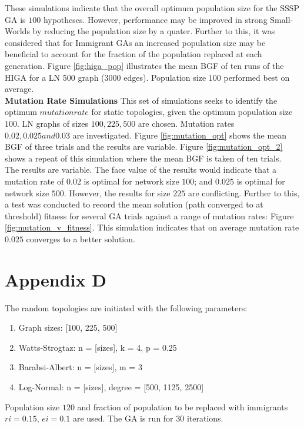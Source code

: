 \documentclass[
	a4paper, %
	10pt, %
	unnumberedsections, %
	twoside, %
]{LTJournalArticle}
\begin{document}
These simulations indicate that the overall optimum population size for the SSSP GA is \(100\) hypotheses. However, performance may be improved in strong Small-Worlds by reducing the population size by a quater. Further to this, it was considered that for Immigrant GAs an increased population size may be beneficial to account for the fraction of the population replaced at each generation. Figure \ref{fig:higa_pop} illustrates the mean BGF of ten runs of the HIGA for a LN 500 graph (3000 edges). Population size \(100\) performed best on average. \\
\textbf{Mutation Rate Simulations} This set of simulations seeks to identify the optimum \(mutation rate\) for static topologies, given the optimum population size \(100\). LN graphs of sizes \(100, 225, 500\) are chosen. Mutation rates \(0.02, 0.025 and 0.03\) are investigated. Figure \ref{fig:mutation_opt} shows the mean BGF of three trials and the results are variable. Figure \ref{fig:mutation_opt_2} shows a repeat of this simulation where the mean BGF is taken of ten trials. \\
The results are variable. The face value of the results would indicate that a mutation rate of \(0.02\) is optimal for network size \(100\); and \(0.025\) is optimal for network size \(500\). However, the results for size \(225\) are conflicting. Further to this, a test was conducted to record the mean solution (path converged to at threshold) fitness for several GA trials against a range of mutation rates: Figure \ref{fig:mutation_v_fitness}. This simulation indicates that on average mutation rate \(0.025\) converges to a better solution. \\

\chapter{Appendix D} 
The random topologies are initiated with the following parameters: 
\begin{enumerate}
	\item Graph sizes: [100, 225, 500] 
	\item Watts-Strogtaz: n = [sizes], k = 4, p = 0.25 
	\item Barabsi-Albert: n = [sizes], m = 3 
	\item Log-Normal: n = [sizes], degree = [500, 1125, 2500] 
\end{enumerate}

Population size \(120\) and fraction of population to be replaced with immigrants \(ri = 0.15\), \(ei = 0.1\) are used. The GA is run for \(30\) iterations. \\
\end{document}
